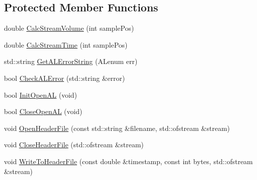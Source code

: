 \subsection*{Protected Member Functions}
\begin{DoxyCompactItemize}
\item 
double \hyperlink{classosa_open_a_l_aafcdcb9c9fcdc92d343582c108aa66eb}{Calc\-Stream\-Volume} (int sample\-Pos)
\item 
double \hyperlink{classosa_open_a_l_a0095fb1596752895e4616f0168078d26}{Calc\-Stream\-Time} (int sample\-Pos)
\item 
std\-::string \hyperlink{classosa_open_a_l_a581d019748f2a432dd3ba23fe5b7e8e2}{Get\-A\-L\-Error\-String} (A\-Lenum err)
\item 
bool \hyperlink{classosa_open_a_l_a8670f1f18f578d02e20c5d00d3b178fb}{Check\-A\-L\-Error} (std\-::string \&error)
\item 
bool \hyperlink{classosa_open_a_l_aaa5c8eba0f816c4aa0aa611856de0b44}{Init\-Open\-A\-L} (void)
\item 
bool \hyperlink{classosa_open_a_l_a4684d1c78bbb60c515b50ea3d9d37716}{Close\-Open\-A\-L} (void)
\item 
void \hyperlink{classosa_open_a_l_ab4e68f4189456499ad8c8a8346558f17}{Open\-Header\-File} (const std\-::string \&filename, std\-::ofstream \&stream)
\item 
void \hyperlink{classosa_open_a_l_aa771d6956d738469013098842d9bd8ae}{Close\-Header\-File} (std\-::ofstream \&stream)
\item 
void \hyperlink{classosa_open_a_l_ac7a1e852e98fb8e4a677707c09f6d066}{Write\-To\-Header\-File} (const double \&timestamp, const int bytes, std\-::ofstream \&stream)
\end{DoxyCompactItemize}
